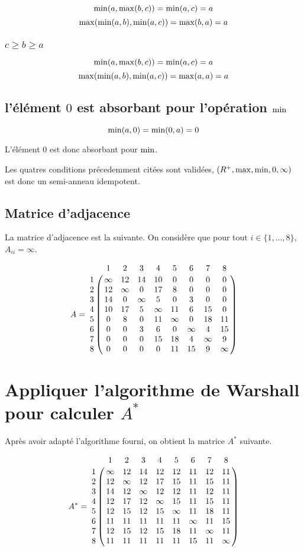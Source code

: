 \documentclass{article}
\begin{document}
$$\operatorname{min}(a, \operatorname{max}(b, c)) = \operatorname{min}(a,c) = a$$
$$\operatorname{max}(\operatorname{min}(a, b),\operatorname{min}(a,c)) = \operatorname{max}(b,a) = a$$

\subsubsection{$c \geq b \geq a$}

$$\operatorname{min}(a, \operatorname{max}(b, c)) = \operatorname{min}(a,c) = a$$
$$\operatorname{max}(\operatorname{min}(a, b),\operatorname{min}(a,c)) = \operatorname{max}(a,a) = a$$

\subsection{l'élément  $0$ est absorbant pour l'opération $\operatorname{min}$}

$$
\operatorname{min}(a,0) = \operatorname{min}(0,a) = 0
$$

L'élément $0$ est donc absorbant pour $\operatorname{min}$.

Les quatres conditions précedemment citées sont validées, $(R^+,
\operatorname{max}, \operatorname{min}, 0, \infty)$ est donc un
semi-anneau idempotent.

\subsection{Matrice d'adjacence}

La matrice d'adjacence est la suivante. On considère que pour tout $i
\in \{1,\dots,8\}$, $A_{ii} = \infty$.

$$
A = \bordermatrix{
    & 1 & 2 & 3 & 4 & 5 & 6 & 7 & 8 \cr
  1 & \infty & 12 & 14 & 10 & 0 & 0 & 0 & 0 \cr
  2 & 12 & \infty & 0 & 17 & 8 & 0 & 0 & 0 \cr
  3 & 14 & 0 & \infty & 5 & 0 & 3 & 0 & 0 \cr
  4 & 10 & 17 & 5 & \infty & 11 & 6 & 15 & 0 \cr
  5 & 0 & 8 & 0 & 11 & \infty & 0 & 18 & 11 \cr
  6 & 0 & 0 & 3 & 6 & 0 & \infty & 4 & 15 \cr
  7 & 0 & 0 & 0 & 15 & 18 & 4 & \infty & 9 \cr
  8 & 0 & 0 & 0 & 0 & 11 & 15 & 9 & \infty
}
$$

\section{Appliquer l'algorithme de Warshall pour calculer $A^*$}

Après avoir adapté l'algorithme fourni, on obtient la matrice $A^*$
suivante.

$$
A^* = \bordermatrix{
    & 1 & 2 & 3 & 4 & 5 & 6 & 7 & 8 \cr
  1 & \infty & 12 & 14 & 12 & 12 & 11 & 12 & 11 \cr
  2 & 12 & \infty & 12 & 17 & 15 & 11 & 15 & 11 \cr
  3 & 14 & 12 & \infty & 12 & 12 & 11 & 12 & 11 \cr
  4 & 12 & 17 & 12 & \infty & 15 & 11 & 15 & 11 \cr
  5 & 12 & 15 & 12 & 15 & \infty & 11 & 18 & 11 \cr
  6 & 11 & 11 & 11 & 11 & 11 & \infty & 11 & 15 \cr
  7 & 12 & 15 & 12 & 15 & 18 & 11 & \infty & 11 \cr
  8 & 11 & 11 & 11 & 11 & 11 & 15 & 11 & \infty
}
$$
\end{document}
